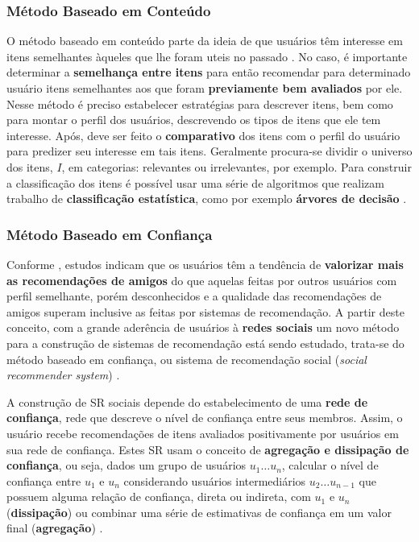 \documentclass[12pt]{article}
\begin{document}
\subsubsection{Método Baseado em Conteúdo}

O método baseado em conteúdo parte da ideia de que usuários têm interesse em itens semelhantes àqueles que lhe foram uteis 
no passado \cite{ricci2011introduction}. No caso, é importante determinar a \textbf{semelhança entre itens} para então recomendar 
para determinado usuário itens semelhantes aos que foram \textbf{previamente bem avaliados} por ele. Nesse método 
é preciso estabelecer estratégias para descrever itens, bem como para montar o perfil dos usuários, descrevendo os tipos 
de itens que ele tem interesse. Após, deve ser feito o \textbf{comparativo} dos itens com o perfil do usuário para 
predizer seu interesse em tais itens. Geralmente procura-se dividir o universo dos itens, $I$, em categorias: relevantes ou 
irrelevantes, por exemplo. Para construir a classificação dos itens é possível usar uma série de algoritmos que 
realizam trabalho de \textbf{classificação estatística}, como por exemplo \textbf{árvores de decisão} \cite{pazzani2007content}. 

\subsubsection{Método Baseado em Confiança}

Conforme \cite{sinha2001comparing}, estudos indicam que os usuários têm a tendência de \textbf{valorizar mais as recomendações de amigos} do que aquelas feitas por outros usuários com perfil semelhante, porém desconhecidos e a qualidade das recomendações de amigos superam inclusive as feitas por sistemas de recomendação. A partir deste conceito, com a grande aderência de usuários 
à \textbf{redes sociais} um novo método para a construção de sistemas de recomendação está sendo estudado, trata-se do método 
baseado em confiança, ou sistema de recomendação social (\textit{social recommender system}) \cite{ricci2011introduction}.

A construção de SR sociais depende do estabelecimento de uma \textbf{rede de confiança}, rede que descreve 
o nível de confiança entre seus membros. Assim, o usuário recebe recomendações de itens avaliados positivamente por usuários 
em sua rede de confiança. Estes SR usam o conceito de \textbf{agregação e dissipação de confiança}, ou seja, 
dados um grupo de usuários $u_1  \dots u_n$, calcular o nível de confiança entre $u_1$ e $u_n$ considerando usuários intermediários
$u_2 \dots u_{n-1}$ que possuem alguma relação de confiança, direta ou indireta, com $u_1$ e $u_n$ (\textbf{dissipação}) ou 
combinar uma série de estimativas de confiança em um valor final (\textbf{agregação}) \cite{victor2011trust}.
\end{document}
